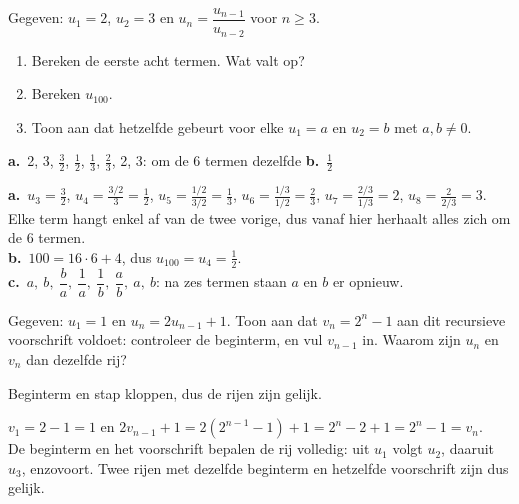 \begin{oefeningen}
\begin{oefening}[3]
Gegeven: $u_1 = 2$, $u_2 = 3$ en $u_n = \dfrac{u_{n-1}}{u_{n-2}}$ voor $n \geqslant 3$.
\begin{enumerate}
  \item Bereken de eerste acht termen. Wat valt op?
  \item Bereken $u_{100}$.
  \item Toon aan dat hetzelfde gebeurt voor elke $u_1 = a$ en $u_2 = b$ met $a, b \neq 0$.
\end{enumerate}
\begin{solution}
\textbf{a.}~2, 3, $\tfrac32$, $\tfrac12$, $\tfrac13$, $\tfrac23$, 2, 3: om de 6 termen dezelfde \quad \textbf{b.}~$\tfrac12$
\end{solution}
\begin{fullsolution}
\textbf{a.}~$u_3=\tfrac32$, $u_4=\tfrac{3/2}{3}=\tfrac12$, $u_5=\tfrac{1/2}{3/2}=\tfrac13$, $u_6=\tfrac{1/3}{1/2}=\tfrac23$, $u_7=\tfrac{2/3}{1/3}=2$, $u_8=\tfrac{2}{2/3}=3$. Elke term hangt enkel af van de twee vorige, dus vanaf hier herhaalt alles zich om de 6 termen.\\
\textbf{b.}~$100=16\cdot 6+4$, dus $u_{100}=u_4=\tfrac12$.\\
\textbf{c.}~$a,\ b,\ \dfrac{b}{a},\ \dfrac{1}{a},\ \dfrac{1}{b},\ \dfrac{a}{b},\ a,\ b$: na zes termen staan $a$ en $b$ er opnieuw.
\end{fullsolution}
\end{oefening}

\begin{oefening}[3]
Gegeven: $u_1 = 1$ en $u_n = 2u_{n-1} + 1$. Toon aan dat $v_n = 2^n - 1$ aan dit recursieve voorschrift voldoet: controleer de beginterm, en vul $v_{n-1}$ in. Waarom zijn $u_n$ en $v_n$ dan dezelfde rij?
\begin{solution}
Beginterm en stap kloppen, dus de rijen zijn gelijk.
\end{solution}
\begin{fullsolution}
$v_1=2-1=1$ en $2v_{n-1}+1=2\left(2^{n-1}-1\right)+1=2^n-2+1=2^n-1=v_n$.\\
De beginterm en het voorschrift bepalen de rij volledig: uit $u_1$ volgt $u_2$, daaruit $u_3$, enzovoort. Twee rijen met dezelfde beginterm en hetzelfde voorschrift zijn dus gelijk.
\end{fullsolution}
\end{oefening}


\end{oefeningen}
